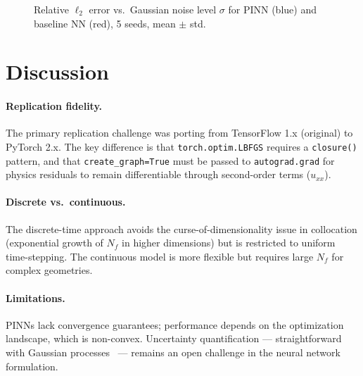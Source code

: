 \documentclass[10pt,twocolumn]{article}
\begin{document}
\begin{figure}[h]
\centering
{}
\caption{Relative $\ell_2$ error vs.\ Gaussian noise level $\sigma$
         for PINN (blue) and baseline NN (red), 5 seeds, mean $\pm$ std.}
\label{fig:noise}
\end{figure}

\section{Discussion}

\paragraph{Replication fidelity.}
The primary replication challenge was porting from TensorFlow 1.x
(original) to PyTorch 2.x.  The key difference is that
\texttt{torch.optim.LBFGS} requires a \texttt{closure()} pattern,
and that \texttt{create\_graph=True} must be passed to
\texttt{autograd.grad} for physics residuals to remain differentiable
through second-order terms ($u_{xx}$).

\paragraph{Discrete vs.\ continuous.}
The discrete-time approach avoids the curse-of-dimensionality issue
in collocation (exponential growth of $N_f$ in higher dimensions)
but is restricted to uniform time-stepping.  The continuous model
is more flexible but requires large $N_f$ for complex geometries.

\paragraph{Limitations.}
PINNs lack convergence guarantees; performance depends on the
optimization landscape, which is non-convex.  Uncertainty
quantification --- straightforward with Gaussian processes~\cite{raissi2017}
--- remains an open challenge in the neural network formulation.

\end{document}
